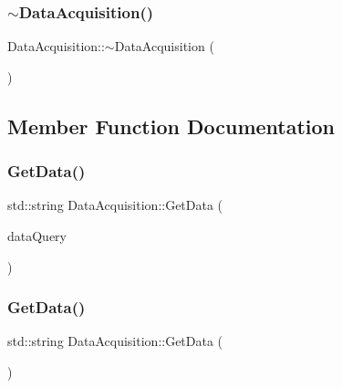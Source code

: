 \mbox{\label{class_data_acquisition_ab3abaaa3e35419b5de6efdeb76747bec}} 
\subsubsection{\texorpdfstring{$\sim$DataAcquisition()}{~DataAcquisition()}\hspace{0.1cm}{\footnotesize\ttfamily [2/2]}}
{\footnotesize\ttfamily Data\+Acquisition\+::$\sim$\+Data\+Acquisition (\begin{DoxyParamCaption}{ }\end{DoxyParamCaption})}



\subsection{Member Function Documentation}
\mbox{\label{class_data_acquisition_ad737fcbfe342830dae2a3b46b63d3dbd}} 
\subsubsection{\texorpdfstring{GetData()}{GetData()}\hspace{0.1cm}{\footnotesize\ttfamily [1/2]}}
{\footnotesize\ttfamily std\+::string Data\+Acquisition\+::\+Get\+Data (\begin{DoxyParamCaption}\item[{\mbox{\hyperlink{_class_adapter_2_class_adapter_2_data_8h_aacb79576e5cf053ee9c93cb9d665e32b}{T\+Y\+P\+ES}}}]{data\+Query }\end{DoxyParamCaption})}

\mbox{\label{class_data_acquisition_ad737fcbfe342830dae2a3b46b63d3dbd}} 
\subsubsection{\texorpdfstring{GetData()}{GetData()}\hspace{0.1cm}{\footnotesize\ttfamily [2/2]}}
{\footnotesize\ttfamily std\+::string Data\+Acquisition\+::\+Get\+Data (\begin{DoxyParamCaption}\item[{\mbox{\hyperlink{_class_adapter_2_class_adapter_2_data_8h_aacb79576e5cf053ee9c93cb9d665e32b}{T\+Y\+P\+ES}}}]{ }\end{DoxyParamCaption})}



